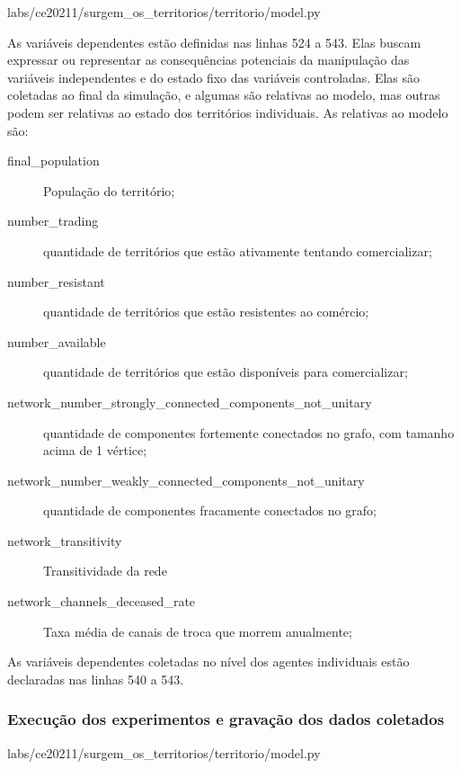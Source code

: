 
{labs/ce20211/surgem_os_territorios/territorio/model.py}

As variáveis dependentes estão definidas nas linhas 524 a 543. Elas buscam expressar ou representar as consequências potenciais da manipulação das variáveis independentes e do estado fixo das variáveis controladas. Elas são coletadas ao final da simulação, e algumas são relativas ao modelo, mas outras podem ser relativas ao estado dos territórios individuais.
As relativas ao modelo são:
\begin{description}
\item [final\_population] População do território;
\item [number\_trading] quantidade de territórios que estão ativamente tentando comercializar; 
\item [number\_resistant] quantidade de territórios que estão resistentes ao comércio; 
\item [number\_available] quantidade de territórios que estão disponíveis para comercializar; 
\item [network\_number\_strongly\_connected\_components\_not\_unitary] quantidade de componentes fortemente conectados no grafo, com tamanho acima de 1 vértice;
\item [network\_number\_weakly\_connected\_components\_not\_unitary] quantidade de componentes fracamente conectados no grafo;
\item [network\_transitivity] Transitividade da rede
\item [network\_channels\_deceased\_rate] Taxa média de canais de troca que morrem anualmente;
\end{description}

As variáveis dependentes coletadas no nível dos agentes individuais estão declaradas nas linhas 540 a 543.

\subsubsection{Execução dos experimentos e gravação dos dados coletados}


{labs/ce20211/surgem_os_territorios/territorio/model.py}


